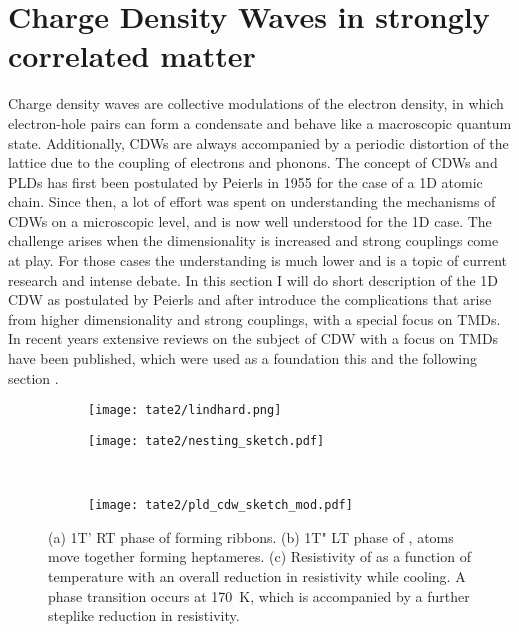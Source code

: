 \section{Charge Density Waves in strongly correlated matter}
\label{sec:cdw}


Charge density waves are collective modulations of the electron density, in which electron-hole pairs can form a condensate and behave like a macroscopic quantum state.
Additionally, CDWs are always accompanied by a periodic distortion of the lattice due to the coupling of electrons and phonons.
The concept of CDWs and PLDs has first been postulated by Peierls in 1955 \cite{peierls_quantum_1996} for the case of a 1D atomic chain.
Since then, a lot of effort was spent on understanding the mechanisms of CDWs on a microscopic level, and is now well understood for the 1D case.
The challenge arises when the dimensionality is increased and strong couplings come at play.
For those cases the understanding is much lower and is a topic of current research and intense debate.
In this section I will do short description of the 1D CDW as postulated by Peierls and after introduce the complications that arise from higher dimensionality and strong couplings, with a special focus on TMDs.
In recent years extensive reviews on the subject of CDW with a focus on TMDs have been published, which were used as a foundation this and the following section \cite{rossnagel_origin_2011, canadell_importance_1992}.

\begin{figure}[t]
	\centering
	\begin{subfigure}[b]{0.45\textwidth}
		\texttt{[image: tate2/lindhard.png]}
	\end{subfigure}
	\hfill
	\begin{subfigure}[b]{0.5\textwidth}
		\texttt{[image: tate2/nesting\_sketch.pdf]}
	\end{subfigure}
	\\
	\begin{subfigure}[b]{0.9\textwidth}
		\texttt{[image: tate2/pld\_cdw\_sketch\_mod.pdf]}
	\end{subfigure}
	\caption{(a) 1T' RT phase of  forming ribbons. (b) 1T" LT phase of ,  atoms move together forming heptameres. (c) Resistivity of  as a function of temperature with an overall reduction in resistivity while cooling. A phase transition occurs at \qty{170}{\kelvin}, which is accompanied by a further steplike reduction in resistivity.}
	\label{fig:cdw_theory}
\end{figure}

